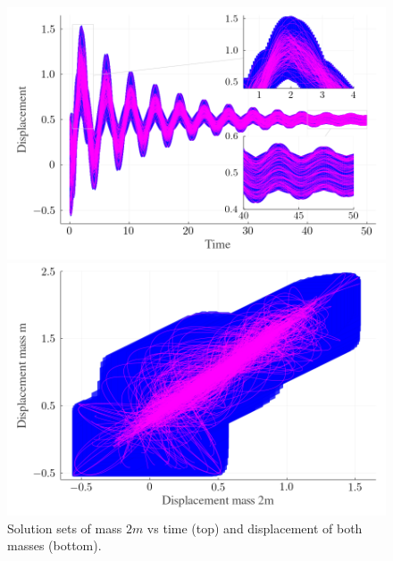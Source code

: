 \documentclass{juliacon}
\begin{document}
\begin{figure}[htb]
	\centering
	\includegraphics[width=0.82\linewidth,keepaspectratio]{example/displacement_vs_time}
	
	\includegraphics[width=0.82\linewidth,keepaspectratio]{example/displacement_vs_displacement}
	\caption{Solution sets of mass $2m$ vs time (top) and displacement of both masses (bottom).}
	\label{fig:example}
\end{figure}



	
\end{document}

